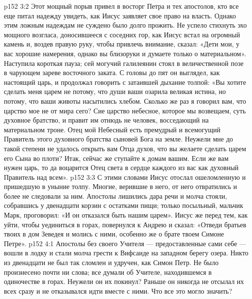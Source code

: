 \vs p152 3:2 Этот мощный порыв привел в восторг Петра и тех апостолов, кто все еще питал надежду увидеть, как Иисус заявляет свое право на власть. Однако этим ложным надеждам не суждено было долго прожить. Не успело стихнуть эхо мощного возгласа, доносившееся с соседних гор, как Иисус встал на огромный камень и, воздев правую руку, чтобы привлечь внимание, сказал: «Дети мои, у вас хорошие намерения, однако вы близоруки и думаете только о материальном». Наступила короткая пауза; сей могучий галилеянин стоял в величественной позе в чарующем зареве восточного заката. С головы до пят он выглядел, как настоящий царь, и продолжал говорить с затаившей дыхание толпой: «Вы хотите сделать меня царем не потому, что души ваши озарила великая истина, но потому, что ваши животы насытились хлебом. Сколько же раз я говорил вам, что царство мое не от мира сего? Сие царство небесное, которое мы возвещаем, суть духовное братство, и правит им отнюдь не человек, восседающий на материальном троне. Отец мой Небесный есть премудрый и всемогущий Правитель этого духовного братства сыновей Бога на земле. Неужели мне до такой степени не удалось открыть вам Отца духов, что вы желаете сделать царем его Сына во плоти? Итак, сейчас же ступайте к домам вашим. Если же вам нужен царь, то да воцарится Отец света в сердце каждого из вас как духовный Правитель над всем».
\vs p152 3:3 \pc С этими словами Иисус отослал ошеломленную и пришедшую в уныние толпу. Многие, верившие в него, от него отвратились и более не следовали за ним. Апостолы лишились дара речи и молча стояли, собравшись у двенадцати корзин с остатками пищи; только посыльный, мальчик Марк, проговорил: «И он отказался быть нашим царем». Иисус же перед тем, как уйти, чтобы уединиться в горах, повернулся к Андрею и сказал: «Отведи братьев твоих в дом Зеведея и молись с ними, особенно же о брате твоем Симоне Петре».
\vs p152 4:1 Апостолы без своего Учителя --- предоставленные сами себе --- вошли в лодку и стали молча грести к Вифсаиде на западном берегу озера. Никто из двенадцати не был так сломлен и удручен, как Симон Петр. Не было произнесено почти ни слова; все думали об Учителе, находившемся в одиночестве в горах. Неужели он их покинул? Раньше он никогда не отсылал их всех сразу и не отказывался идти вместе с ними. Что все это могло значить?
